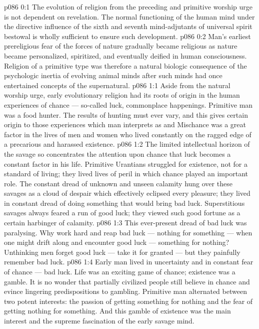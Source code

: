 \author{Brilliant Evening Star}
\vs p086 0:1 The evolution of religion from the preceding and primitive worship urge is not dependent on revelation. The normal functioning of the human mind under the directive influence of the sixth and seventh mind\hyp{}adjutants of universal spirit bestowal is wholly sufficient to ensure such development.
\vs p086 0:2 Man’s earliest prereligious fear of the forces of nature gradually became religious as nature became personalized, spiritized, and eventually deified in human consciousness. Religion of a primitive type was therefore a natural biologic consequence of the psychologic inertia of evolving animal minds after such minds had once entertained concepts of the supernatural.
\vs p086 1:1 Aside from the natural worship urge, early evolutionary religion had its roots of origin in the human experiences of chance --- so\hyp{}called luck, commonplace happenings. Primitive man was a food hunter. The results of hunting must ever vary, and this gives certain origin to those experiences which man interprets as  and  Mischance was a great factor in the lives of men and women who lived constantly on the ragged edge of a precarious and harassed existence.
\vs p086 1:2 The limited intellectual horizon of the savage so concentrates the attention upon chance that luck becomes a constant factor in his life. Primitive Urantians struggled for existence, not for a standard of living; they lived lives of peril in which chance played an important role. The constant dread of unknown and unseen calamity hung over these savages as a cloud of despair which effectively eclipsed every pleasure; they lived in constant dread of doing something that would bring bad luck. Superstitious savages always feared a run of good luck; they viewed such good fortune as a certain harbinger of calamity.
\vs p086 1:3 This ever\hyp{}present dread of bad luck was paralysing. Why work hard and reap bad luck --- nothing for something --- when one might drift along and encounter good luck --- something for nothing? Unthinking men forget good luck --- take it for granted --- but they painfully remember bad luck.
\vs p086 1:4 Early man lived in uncertainty and in constant fear of chance --- bad luck. Life was an exciting game of chance; existence was a gamble. It is no wonder that partially civilized people still believe in chance and evince lingering predispositions to gambling. Primitive man alternated between two potent interests: the passion of getting something for nothing and the fear of getting nothing for something. And this gamble of existence was the main interest and the supreme fascination of the early savage mind.
